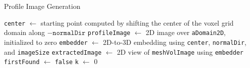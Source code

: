 \documentclass{standalone}
\begin{document}
\begin{algorithm}[H]
    \caption{Profile Image Generation}\label{ALGO:imagePro}

    \texttt{center} $\gets$ starting point computed by shifting the center of the voxel grid domain along $-\texttt{normalDir}$\;
    \texttt{profileImage} $\gets$ 2D image over \texttt{aDomain2D}, initialized to zero\;
    \texttt{embedder} $\gets$ 2D-to-3D embedding using \texttt{center}, \texttt{normalDir}, and \texttt{imageSize}\;
    \texttt{extractedImage} $\gets$ 2D view of \texttt{meshVolImage} using \texttt{embedder}\;
    \texttt{firstFound} $\gets$ \texttt{false}\;
    \texttt{k} $\gets$ 0\;


    \;
\end{algorithm}
\end{document}
